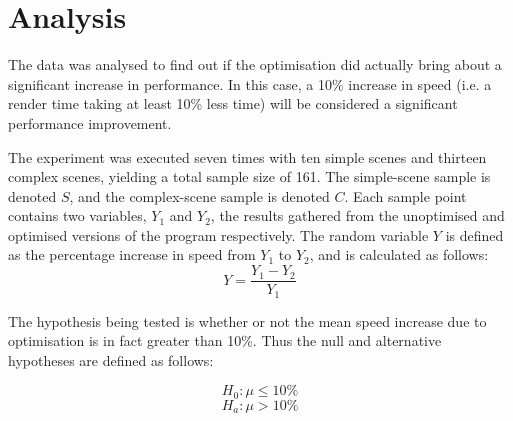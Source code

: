 \documentclass[a4paper]{article}
\begin{document}
\section{Analysis}
The data was analysed to find out if the optimisation did actually bring about a significant increase in performance. In this case, a 10\% increase in speed (i.e. a render time taking at least 10\% less time) will be considered a significant performance improvement.

The experiment was executed seven times with ten simple scenes and thirteen complex scenes, yielding a total sample size of 161. The simple-scene sample is denoted $S$, and the complex-scene sample is denoted $C$. Each sample point contains two variables, $Y_1$ and $Y_2$, the results gathered from the unoptimised and optimised versions of the program respectively. The random variable $Y$ is defined as the percentage increase in speed from $Y_1$ to $Y_2$, and is calculated as follows:
$$
Y = \frac{Y_1 - Y_2}{Y_1}
$$

\begin{center}
\end{center}

The hypothesis being tested is whether or not the mean speed increase due to optimisation is in fact greater than 10\%. Thus the null and alternative hypotheses are defined as follows:

$$ H_0: \mu \leq 10\% $$
$$ H_a: \mu > 10\% $$
\end{document}
